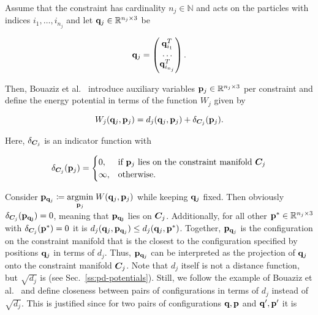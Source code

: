 Assume that the constraint has cardinality 
$n_j \in \mathbb{N}$ and acts on the particles with indices $i_1, \ldots, i_{n_j}$ and let $\mathbf{q}_j \in \mathbb{R}^{n_j \times 3}$ be

\[
    \mathbf{q}_j = \begin{pmatrix}
        \mathbf{q}_{i_1}^T \\
        \ldots \\
        \mathbf{q}_{i_{n_j}}^T
    \end{pmatrix}.
\]

\noindent Then, Bouaziz et al.\ \cite{bouaziz2014} introduce auxiliary variables $\mathbf{p}_j \in \mathbb{R}^{n_j \times 3}$ per constraint 
and define the energy potential in terms of the function $W_j$ given by 

\begin{equation}\label{eq:pd-Wj}
    W_j(\mathbf{q}_j, \mathbf{p}_j) = d_j(\mathbf{q}_j, \mathbf{p}_j) + \delta_{\bm{C}_j}(\mathbf{p}_j).
\end{equation}

\noindent Here, $\delta_{\bm{C}_j}$ is an indicator function with 

\begin{equation}\label{eq:indicator-function}
\delta_{\bm{C}_j}(\mathbf{p}_j)= 
\begin{cases}
0,& \text{if } \mathbf{p}_j \text{ lies on the constraint manifold } \bm{C}_j \\
\infty,& \text{otherwise.}
\end{cases}
\end{equation}


\noindent Consider $\mathbf{p}_{\mathbf{q}_j} \coloneqq \underset{\mathbf{p}_j}{\operatorname{argmin}}\; W(\mathbf{q}_j, \mathbf{p}_j)$ while keeping $\mathbf{q}_j$ 
fixed. Then obviously 
$\delta_{\bm{C}_j}(\mathbf{p_{\mathbf{q}_j}}) = 0$, meaning that $\mathbf{p_{\mathbf{q}_j}}$ lies on $\bm{C}_j$. Additionally, 
for all other
$\mathbf{p}^* \in \mathbb{R}^{n_j \times 3}$ with $\delta_{\bm{C}_j}(\mathbf{p}^*) = 0$ it is $d_j(\mathbf{q}_j, \mathbf{p}_{\mathbf{q}_j}) 
\leq
d_j(\mathbf{q}_j, \mathbf{p}^*)$. Together, $\mathbf{p}_{\mathbf{q}_j}$ is the configuration on the constraint manifold that is the closest to 
the configuration specified by positions $\mathbf{q}_j$ in terms of $d_j$. Thus, $\mathbf{p}_{\mathbf{q}_j}$ can be 
interpreted as the projection of $\mathbf{q}_j$ onto the constraint manifold $\bm{C}_j$. Note that $d_j$ itself is not a distance 
function, but $\sqrt{d_j}$ is (see Sec.\ \ref{ss:pd-potentials}). Still, we follow the example of Bouaziz et al.\ \cite{bouaziz2014} 
and define closeness between pairs of configurations in terms of $d_j$ instead of $\sqrt{d_j}$. This is justified since for two pairs
of configurations $\mathbf{q}, \mathbf{p}$ and $\mathbf{q}^\prime, \mathbf{p}^\prime$ it is 

